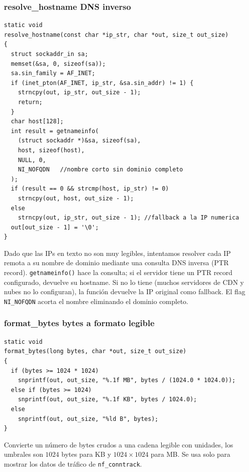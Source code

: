 \documentclass[12pt,letterpaper]{article}
\begin{document}
\subsubsection*{resolve\_hostname  DNS inverso}

\begin{lstlisting}[style=modernc, caption={\texttt{net\_monitor.c} resolve\_hostname()}]
static void
resolve_hostname(const char *ip_str, char *out, size_t out_size)
{
  struct sockaddr_in sa;
  memset(&sa, 0, sizeof(sa));
  sa.sin_family = AF_INET;
  if (inet_pton(AF_INET, ip_str, &sa.sin_addr) != 1) {
    strncpy(out, ip_str, out_size - 1);
    return;
  }
  char host[128];
  int result = getnameinfo(
    (struct sockaddr *)&sa, sizeof(sa),
    host, sizeof(host),
    NULL, 0,
    NI_NOFQDN   //nombre corto sin dominio completo
  );
  if (result == 0 && strcmp(host, ip_str) != 0)
    strncpy(out, host, out_size - 1);
  else
    strncpy(out, ip_str, out_size - 1); //fallback a la IP numerica
  out[out_size - 1] = '\0';
}
\end{lstlisting}

Dado que las IPs en texto no son muy legibles, intentamos resolver cada IP remota a su nombre de dominio
mediante una consulta DNS inversa (PTR record). \texttt{getnameinfo()} hace la consulta; si el servidor tiene
un PTR record configurado, devuelve su hostname. Si no lo tiene (muchos servidores de CDN y nubes no lo
configuran), la función devuelve la IP original como fallback. El flag \texttt{NI\_NOFQDN} acorta el nombre
eliminando el dominio completo.

\subsubsection*{format\_bytes bytes a formato legible}

\begin{lstlisting}[style=modernc, caption={\texttt{net\_monitor.c} format\_bytes()}]
static void
format_bytes(long bytes, char *out, size_t out_size)
{
  if (bytes >= 1024 * 1024)
    snprintf(out, out_size, "%.1f MB", bytes / (1024.0 * 1024.0));
  else if (bytes >= 1024)
    snprintf(out, out_size, "%.1f KB", bytes / 1024.0);
  else
    snprintf(out, out_size, "%ld B", bytes);
}
\end{lstlisting}

Convierte un número de bytes crudos a una cadena legible con unidades, los umbrales son $1024$ bytes para KB y
$1024 \times 1024$ para MB. Se usa solo para mostrar los datos de tráfico de \texttt{nf\_conntrack}.
\end{document}
